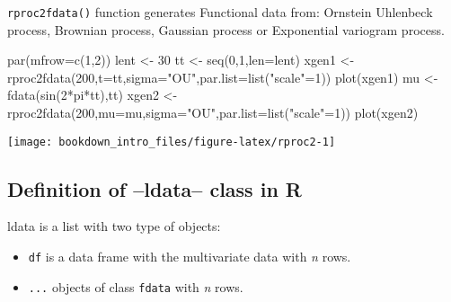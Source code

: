 \documentclass[
]{book}
\newenvironment{Shaded}{\begin{snugshade}}{\end{snugshade}}
\newcommand{\AttributeTok}[1]{\textcolor[rgb]{0.77,0.63,0.00}{#1}}
\newcommand{\DecValTok}[1]{\textcolor[rgb]{0.00,0.00,0.81}{#1}}
\newcommand{\FunctionTok}[1]{\textcolor[rgb]{0.00,0.00,0.00}{#1}}
\newcommand{\NormalTok}[1]{#1}
\newcommand{\OtherTok}[1]{\textcolor[rgb]{0.56,0.35,0.01}{#1}}
\newcommand{\SpecialCharTok}[1]{\textcolor[rgb]{0.00,0.00,0.00}{#1}}
\newcommand{\StringTok}[1]{\textcolor[rgb]{0.31,0.60,0.02}{#1}}
\begin{document}
\texttt{rproc2fdata()} function generates Functional data from: Ornstein Uhlenbeck process, Brownian process, Gaussian process or Exponential variogram process.

\begin{Shaded}
\begin{Highlighting}[]
\FunctionTok{par}\NormalTok{(}\AttributeTok{mfrow=}\FunctionTok{c}\NormalTok{(}\DecValTok{1}\NormalTok{,}\DecValTok{2}\NormalTok{))}
\NormalTok{lent }\OtherTok{\textless{}{-}} \DecValTok{30}
\NormalTok{tt }\OtherTok{\textless{}{-}} \FunctionTok{seq}\NormalTok{(}\DecValTok{0}\NormalTok{,}\DecValTok{1}\NormalTok{,}\AttributeTok{len=}\NormalTok{lent)}
\NormalTok{xgen1 }\OtherTok{\textless{}{-}} \FunctionTok{rproc2fdata}\NormalTok{(}\DecValTok{200}\NormalTok{,}\AttributeTok{t=}\NormalTok{tt,}\AttributeTok{sigma=}\StringTok{"OU"}\NormalTok{,}\AttributeTok{par.list=}\FunctionTok{list}\NormalTok{(}\StringTok{"scale"}\OtherTok{=}\DecValTok{1}\NormalTok{))}
\FunctionTok{plot}\NormalTok{(xgen1)}
\NormalTok{mu }\OtherTok{\textless{}{-}} \FunctionTok{fdata}\NormalTok{(}\FunctionTok{sin}\NormalTok{(}\DecValTok{2}\SpecialCharTok{*}\NormalTok{pi}\SpecialCharTok{*}\NormalTok{tt),tt)}
\NormalTok{xgen2 }\OtherTok{\textless{}{-}} \FunctionTok{rproc2fdata}\NormalTok{(}\DecValTok{200}\NormalTok{,}\AttributeTok{mu=}\NormalTok{mu,}\AttributeTok{sigma=}\StringTok{"OU"}\NormalTok{,}\AttributeTok{par.list=}\FunctionTok{list}\NormalTok{(}\StringTok{"scale"}\OtherTok{=}\DecValTok{1}\NormalTok{))}
\FunctionTok{plot}\NormalTok{(xgen2)}
\end{Highlighting}
\end{Shaded}

\begin{center}\texttt{[image: bookdown\_intro\_files/figure-latex/rproc2-1]} \end{center}

\hypertarget{definition-of-ldata-class-in-r}{%
\subsection{Definition of --ldata-- class in R}\label{definition-of-ldata-class-in-r}}

ldata is a list with two type of objects:

\begin{itemize}
\item
  \texttt{df} is a data frame with the multivariate data with \emph{n} rows.
\item
  \texttt{...} objects of class \texttt{fdata} with \emph{n} rows.
\end{itemize}
\end{document}

